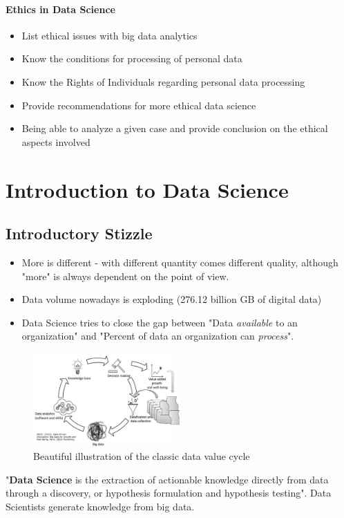 \documentclass[a4paper]{article}
\begin{document}
		\paragraph{Ethics in Data Science}
		
			\begin{itemize}
				\item List ethical issues with big data analytics
				\item Know the conditions for processing of personal data
				\item Know the Rights of Individuals regarding personal data processing
				\item Provide recommendations for more ethical data science
				\item Being able to analyze a given case and provide conclusion on the ethical aspects involved
			\end{itemize}
		
	\newpage
	
	\section{Introduction to Data Science}
	
		\subsection{Introductory Stizzle}
		
		\begin{itemize}
			\item More is different - with different quantity comes different quality, although "more" is always dependent on the point of view.
			\item Data volume nowadays is exploding (276.12 billion GB of digital data)
			\item Data Science tries to close the gap between "Data \textit{available} to an organization" and "Percent of data an organization can \textit{process}".
		\end{itemize}
	
		\begin{figure}[htb!]
			\centering
			\includegraphics[width=0.5\textwidth]{img/sw01/data_value_cycle.png}
			\caption{Beautiful illustration of the classic data value cycle}
		\end{figure}
	\noindent
		"\textbf{Data Science} is the extraction of actionable knowledge directly from data through a discovery, or hypothesis formulation and hypothesis testing".
		Data Scientists generate knowledge from big data.
		
\end{document}
